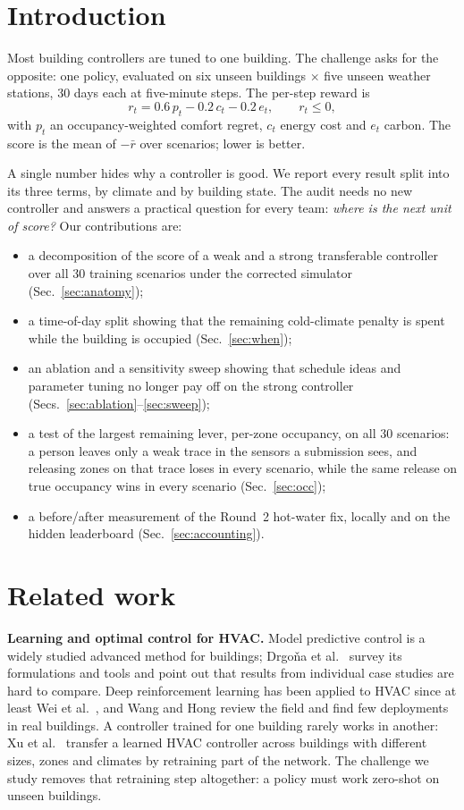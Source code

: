 \documentclass{article}
\begin{document}
\section{Introduction}
Most building controllers are tuned to one building. The challenge asks for the opposite: one policy, evaluated on six unseen buildings $\times$ five unseen weather stations, 30 days each at five-minute steps. The per-step reward is
\[ r_t = 0.6\,p_t - 0.2\,c_t - 0.2\,e_t, \qquad r_t \le 0, \]
with $p_t$ an occupancy-weighted comfort regret, $c_t$ energy cost and $e_t$ carbon. The score is the mean of $-\bar r$ over scenarios; lower is better.

A single number hides why a controller is good. We report every result split into its three terms, by climate and by building state. The audit needs no new controller and answers a practical question for every team: \emph{where is the next unit of score?} Our contributions are:
\begin{itemize}
  \item a decomposition of the score of a weak and a strong transferable controller over all 30 training scenarios under the corrected simulator (Sec.~\ref{sec:anatomy});
  \item a time-of-day split showing that the remaining cold-climate penalty is spent while the building is occupied (Sec.~\ref{sec:when});
  \item an ablation and a sensitivity sweep showing that schedule ideas and parameter tuning no longer pay off on the strong controller (Secs.~\ref{sec:ablation}--\ref{sec:sweep});
  \item a test of the largest remaining lever, per-zone occupancy, on all 30 scenarios: a person leaves only a weak trace in the sensors a submission sees, and releasing zones on that trace loses in every scenario, while the same release on true occupancy wins in every scenario (Sec.~\ref{sec:occ});
  \item a before/after measurement of the Round~2 hot-water fix, locally and on the hidden leaderboard (Sec.~\ref{sec:accounting}).
\end{itemize}

\section{Related work}\label{sec:related}
\textbf{Learning and optimal control for HVAC.} Model predictive control is a widely studied advanced method for buildings; Drgo\v{n}a et al.\ \cite{drgona2020} survey its formulations and tools and point out that results from individual case studies are hard to compare. Deep reinforcement learning has been applied to HVAC since at least Wei et al.\ \cite{wei2017}, and Wang and Hong \cite{wang2020} review the field and find few deployments in real buildings. A controller trained for one building rarely works in another: Xu et al.\ \cite{xu2020} transfer a learned HVAC controller across buildings with different sizes, zones and climates by retraining part of the network. The challenge we study removes that retraining step altogether: a policy must work zero-shot on unseen buildings.
\end{document}
